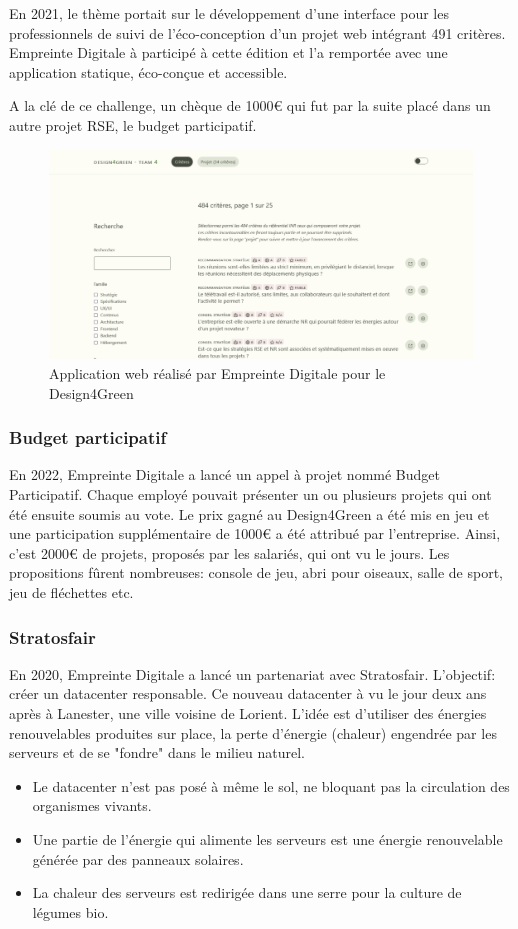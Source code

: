 \documentclass[12pt, a4paper, twoside]{article}
\begin{document}
En 2021, le thème portait sur le développement d'une interface pour les professionnels de suivi de l'éco-conception d'un projet web intégrant 491 critères.
Empreinte Digitale à participé à cette édition et l'a remportée avec une application statique, éco-conçue et accessible.

A la clé de ce challenge, un chèque de 1000€ qui fut par la suite placé dans un autre projet \gls{RSE}, le budget participatif.

\begin{figure}[!ht]
    \centering
    \includegraphics[width=\textwidth]{src/interface_d4g.png}
    \caption{Application web réalisé par Empreinte Digitale pour le Design4Green}
    \label{fig:design4greenl}
\end{figure}

\newpage
\subsubsection{Budget participatif}
En 2022, Empreinte Digitale a lancé un appel à projet nommé Budget Participatif. 
Chaque employé pouvait présenter un ou plusieurs projets qui ont été ensuite soumis au vote. 
Le prix gagné au Design4Green a été mis en jeu et une participation supplémentaire de 1000€ a été attribué par l'entreprise. 
Ainsi, c'est 2000€ de projets, proposés par les salariés, qui ont vu le jours. 
Les propositions fûrent nombreuses: console de jeu, abri pour oiseaux, salle de sport, jeu de fléchettes etc.

\subsubsection{Stratosfair}
En 2020, Empreinte Digitale a lancé un partenariat avec Stratosfair. 
L'objectif: créer un datacenter responsable. 
Ce nouveau datacenter à vu le jour deux ans après à Lanester, une ville voisine de Lorient. 
L'idée est d'utiliser des énergies renouvelables produites sur place, la perte d'énergie (chaleur) engendrée par les serveurs et de se "fondre" dans le milieu naturel.
\begin{itemize}
    \item Le datacenter n'est pas posé à même le sol, ne bloquant pas la circulation des organismes vivants.
    \item Une partie de l'énergie qui alimente les serveurs est une énergie renouvelable générée par des panneaux solaires.
    \item La chaleur des serveurs est redirigée dans une serre pour la culture de légumes bio.
\end{itemize}
\end{document}
